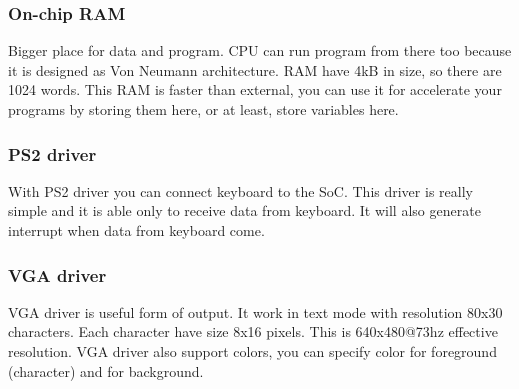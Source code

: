 \subsubsection{On-chip RAM}

Bigger place for data and program. CPU can run program from there too because
it is designed as Von Neumann architecture. RAM have 4kB in size, so there are
1024 words. This RAM is faster than external, you can use it for accelerate your
programs by storing them here, or at least, store variables here.

\subsubsection{PS2 driver}

With PS2 driver you can connect keyboard to the SoC. This driver is really
simple and it is able only to receive data from keyboard. It will also generate
interrupt when data from keyboard come.

\subsubsection{VGA driver}

VGA driver is useful form of output. It work in text mode with resolution 80x30
characters. Each character have size 8x16 pixels. This is 640x480@73hz effective
resolution. VGA driver also support colors, you can specify color for foreground
(character) and for background.
